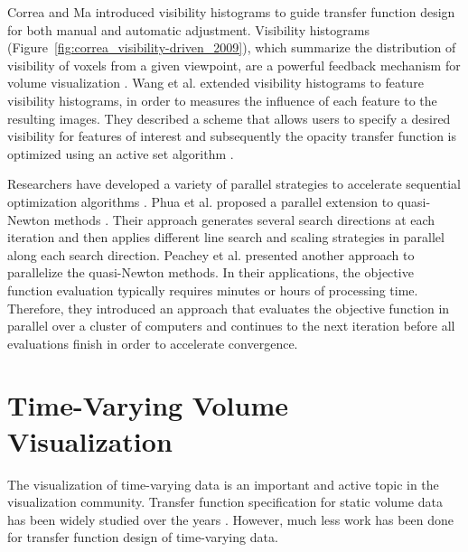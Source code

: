 \documentclass{egpubl}
\begin{document}
Correa and Ma \cite{correa_visibility-driven_2009} introduced visibility histograms to guide transfer function design for both manual and automatic adjustment.
Visibility histograms (Figure~\ref{fig:correa_visibility-driven_2009}), which summarize the distribution of visibility of voxels from a given viewpoint, are a powerful feedback mechanism for volume visualization \cite{emsenhuber_visibility_2008}.
Wang et al. \cite{wang_efficient_2011} extended visibility histograms to feature visibility histograms, in order to measures the influence of each feature to the resulting images. They described a scheme that allows users to specify a desired visibility for features of interest and subsequently the opacity transfer function is optimized using an active set algorithm \cite{polyak_conjugate_1969}.


Researchers have developed a variety of parallel strategies to accelerate sequential optimization algorithms \cite{spedicato_algorithms_2012}.
Phua et al. \cite{phua_parallel_1998} proposed a parallel extension to quasi-Newton methods \cite{yang_optimization_2001}. Their approach generates several search directions at each iteration and then applies different line search and scaling strategies in parallel along each search direction.
Peachey et al. \cite{peachey_parallel_2009} presented another approach to parallelize the quasi-Newton methods.
In their applications, the objective function evaluation typically requires minutes or hours of processing time. Therefore, they introduced an approach that evaluates the objective function in parallel over a cluster of computers and continues to the next iteration before all evaluations finish in order to accelerate convergence.

\section{Time-Varying Volume Visualization}
The visualization of time-varying data is an important and active topic in the visualization community. Transfer function specification for static volume data has been widely studied over the years \cite{pfister_transfer_2001}. However, much less work has been done for transfer function design of time-varying data.
\end{document}

